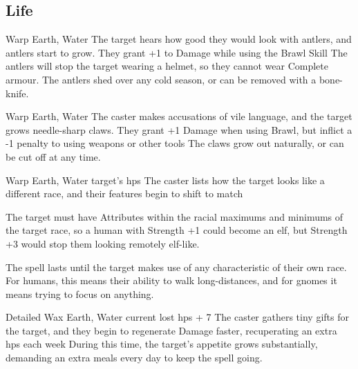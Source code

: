 \begin{multicols}{2}
{  



  \subsection{Life}
  \label{lifeSpells}


    {}%
    {Warp}%
    {Earth, Water}%
    {}%
    {The target hears how good they would look with antlers, and antlers start to grow.
    They grant +1 to Damage while using the Brawl Skill}%
    {
    The antlers will stop the target wearing a helmet, so they cannot wear Complete armour.
    The antlers shed over any cold season, or can be removed with a bone-knife.}

    {}%
    {Warp}%
    {Earth, Water}%
    {}%
    {The caster makes accusations of vile language, and the target grows needle-sharp claws.
    They grant +1 Damage when using Brawl, but inflict a -1 penalty to using weapons or other tools}%
    {
    The claws grow out naturally, or can be cut off at any time.}

    {}%
    {Warp}%
    {Earth, Water}%
    {target's \glspl{hp}}%
    {The caster lists how the target looks like a different race, and their features begin to shift to match}%
    {The target must have Attributes within the racial maximums and minimums of the target race, so a human with Strength +1 could become an elf, but Strength +3 would stop them looking remotely elf-like.

    The spell lasts until the target makes use of any characteristic of their own race.
    For humans, this means their ability to walk long-distances, and for gnomes it means trying to focus on anything.}

    {Detailed}%
    {Wax}%
    {Earth, Water}%
    {current lost \glspl{hp} + 7}%
    {The caster gathers tiny gifts for the target, and they begin to regenerate Damage faster, recuperating an extra  \glspl{hp} each week}%
    {During this time, the target's appetite grows substantially, demanding an extra  meals every day to keep the spell going.}

}
\end{multicols}
